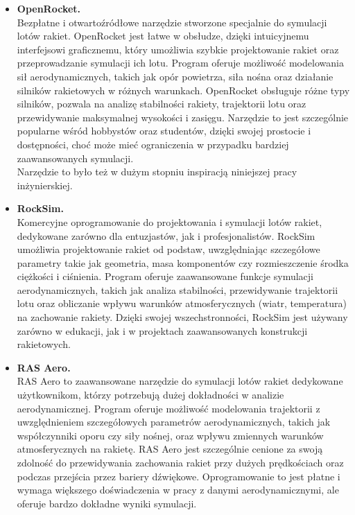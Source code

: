\begin{itemize}

    \item \textbf{OpenRocket.}
    \\Bezpłatne i otwartoźródłowe narzędzie stworzone specjalnie do symulacji lotów rakiet. OpenRocket jest łatwe w obsłudze, dzięki intuicyjnemu interfejsowi graficznemu, który umożliwia szybkie projektowanie rakiet oraz przeprowadzanie symulacji ich lotu. Program oferuje możliwość modelowania sił aerodynamicznych, takich jak opór powietrza, siła nośna oraz działanie silników rakietowych w różnych warunkach.
    OpenRocket obsługuje różne typy silników, pozwala na analizę stabilności rakiety, trajektorii lotu oraz przewidywanie maksymalnej wysokości i zasięgu. Narzędzie to jest szczególnie popularne wśród hobbystów oraz studentów, dzięki swojej prostocie i dostępności, choć może mieć ograniczenia w przypadku bardziej zaawansowanych symulacji.
    \\Narzędzie to było też w dużym stopniu inspiracją niniejszej pracy
    inżynierskiej.


    \item \textbf{RockSim.}
    \\Komercyjne oprogramowanie do projektowania i symulacji lotów rakiet, dedykowane zarówno dla entuzjastów, jak i profesjonalistów. RockSim umożliwia projektowanie rakiet od podstaw, uwzględniając szczegółowe parametry takie jak geometria, masa komponentów czy rozmieszczenie środka ciężkości i ciśnienia.
    Program oferuje zaawansowane funkcje symulacji aerodynamicznych, takich jak analiza stabilności, przewidywanie trajektorii lotu oraz obliczanie wpływu warunków atmosferycznych (wiatr, temperatura) na zachowanie rakiety. Dzięki swojej wszechstronności, RockSim jest używany zarówno w edukacji, jak i w projektach zaawansowanych konstrukcji rakietowych.


    \item \textbf{RAS Aero.}
    \\RAS Aero to zaawansowane narzędzie do symulacji lotów rakiet dedykowane użytkownikom, którzy potrzebują dużej dokładności w analizie aerodynamicznej. Program oferuje możliwość modelowania trajektorii z uwzględnieniem szczegółowych parametrów aerodynamicznych, takich jak współczynniki oporu czy siły nośnej, oraz wpływu zmiennych warunków atmosferycznych na rakietę.
    RAS Aero jest szczególnie cenione za swoją zdolność do przewidywania zachowania rakiet przy dużych prędkościach oraz podczas przejścia przez bariery dźwiękowe. Oprogramowanie to jest płatne i wymaga większego doświadczenia w pracy z danymi aerodynamicznymi, ale oferuje bardzo dokładne wyniki symulacji.


\end{itemize}


